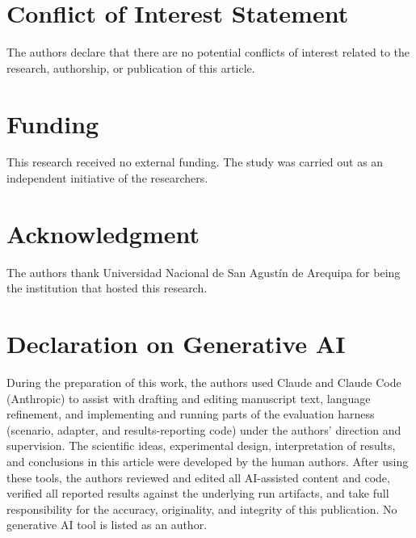 \documentclass[conference,letterpaper]{IEEEtran}
\begin{document}
\section*{Conflict of Interest Statement}
The authors declare that there are no potential conflicts of interest related to the research,
authorship, or publication of this article.

\section*{Funding}
This research received no external funding. The study was carried out as an independent initiative
of the researchers.

\section*{Acknowledgment}
The authors thank Universidad Nacional de San Agust\'in de Arequipa for being the institution that
hosted this research.

\section*{Declaration on Generative AI}
During the preparation of this work, the authors used Claude and Claude Code (Anthropic) to assist
with drafting and editing manuscript text, language refinement, and implementing and running parts of
the evaluation harness (scenario, adapter, and results-reporting code) under the authors' direction
and supervision. The scientific ideas, experimental design, interpretation of results, and conclusions
in this article were developed by the human authors. After using these tools, the authors reviewed and
edited all AI-assisted content and code, verified all reported results against the underlying run
artifacts, and take full responsibility for the accuracy, originality, and integrity of this
publication. No generative AI tool is listed as an author.

\balance


\end{document}
